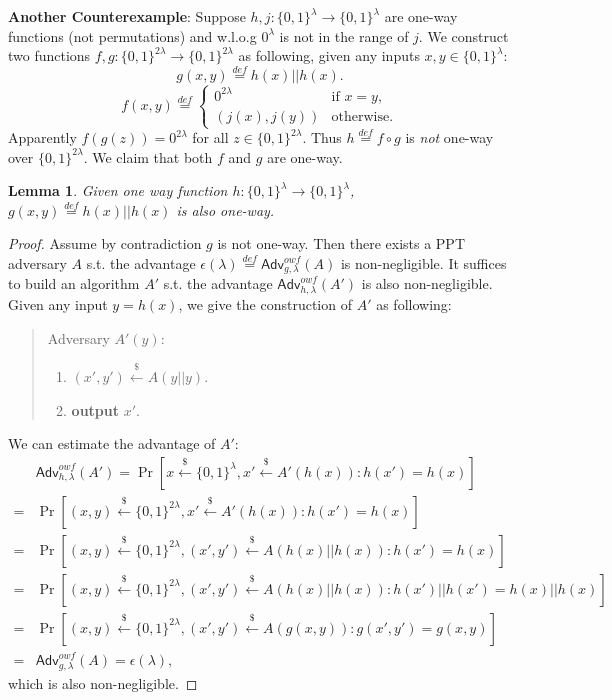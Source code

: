 \documentclass[12pt]{article}
\newcommand{\eqdef}{\stackrel{def}{=}}
\newcommand{\bits}{\{0,1\}}
\newcommand{\getsr}{\stackrel{\$}{\gets}}
\newcommand{\Adv}{\textsf{Adv}}
\newtheorem{lemma}[theorem]{Lemma}
\theoremstyle{definition}
\begin{document}
{\bf Another Counterexample}: Suppose $h, j : \bits^\lambda \to \bits^\lambda$ are one-way functions (not permutations) and w.l.o.g $0^\lambda$ is not in the range of $j$. We construct two functions $f,g : \bits^{2\lambda} \to \bits^{2\lambda}$ as following, given any inputs $x, y \in \bits^\lambda$:
$$g(x,y) \eqdef h(x) || h(x).$$
$$f(x,y) \eqdef
\begin{cases}
0^{2\lambda} & \textrm{if $x=y$,} \\
(j(x),j(y)) & \textrm{otherwise.}
\end{cases}$$
Apparently $f(g(z)) = 0^{2\lambda}$ for all $z\in\bits^{2\lambda}$. Thus $h\eqdef f\circ g$ is \emph{not} one-way over $\bits^{2\lambda}$.
We claim that both $f$ and $g$ are one-way.
\begin{lemma}
Given one way function $h : \bits^\lambda \to \bits^\lambda$, $g(x,y) \eqdef h(x) || h(x)$ is also one-way.
\end{lemma}
\begin{proof}
Assume by contradiction $g$ is not one-way. Then there exists a PPT adversary $A$ s.t. the advantage $\epsilon(\lambda) \eqdef \Adv_{g,\lambda}^{owf}(A)$ is non-negligible. It suffices to build an algorithm $A'$ s.t. the advantage $\Adv_{h,\lambda}^{owf}(A')$ is also non-negligible. Given any input $y=h(x)$, we give the construction of $A'$ as following:
\begin{quote}
Adversary $A' (y)$:
\begin{enumerate}
\item $(x', y') \getsr A(y || y)$.
\item {\bf output} $x'$.
\end{enumerate}
\end{quote}
We can estimate the advantage of $A'$:
$$
\begin{aligned}
&\Adv_{h,\lambda}^{owf}(A') = \Pr[x\getsr \bits^\lambda, x' \getsr A'(h(x)) : h(x')=h(x)] \\
=& \Pr[(x,y)\getsr \bits^{2\lambda}, x' \getsr A'(h(x)) : h(x')=h(x)] \\
=& \Pr[(x,y)\getsr \bits^{2\lambda}, (x', y') \getsr A(h(x) || h(x)) : h(x')=h(x)] \\
=& \Pr[(x,y)\getsr \bits^{2\lambda}, (x', y') \getsr A(h(x) || h(x)) : h(x')||h(x') = h(x)||h(x)] \\
=& \Pr[(x,y)\getsr \bits^{2\lambda}, (x', y') \getsr A(g(x, y)) : g(x', y') = g(x, y)] \\
=& \Adv_{g,\lambda}^{owf}(A) = \epsilon(\lambda),
\end{aligned}
$$
which is also non-negligible.
\end{proof}
\end{document}
